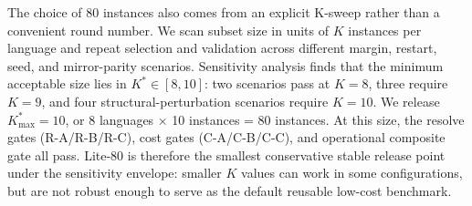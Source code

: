 The choice of 80 instances also comes from an explicit K-sweep rather than a convenient round number. We scan subset size in units of $K$ instances per language and repeat selection and validation across different margin, restart, seed, and mirror-parity scenarios. Sensitivity analysis finds that the minimum acceptable size lies in $K^*\in[8,10]$: two scenarios pass at $K{=}8$, three require $K{=}9$, and four structural-perturbation scenarios require $K{=}10$. We release $K^*_{\max}=10$, or 8 languages $\times$ 10 instances = 80 instances. At this size, the resolve gates (R-A/R-B/R-C), cost gates (C-A/C-B/C-C), and operational composite gate all pass. Lite-80 is therefore the smallest conservative stable release point under the sensitivity envelope: smaller $K$ values can work in some configurations, but are not robust enough to serve as the default reusable low-cost benchmark.
